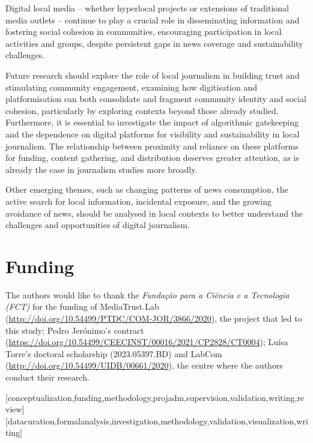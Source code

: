 \documentclass[english]{textolivre}
\begin{document}
Digital local media -- whether hyperlocal projects or extensions of traditional media outlets -- continue to play a crucial role in disseminating information and fostering social cohesion in communities, encouraging participation in local activities and groups, despite persistent gaps in news coverage and sustainability challenges.

Future research should explore the role of local journalism in building trust and stimulating community engagement, examining how digitisation and platformisation can both consolidate and fragment community identity and social cohesion, particularly by exploring contexts beyond those already studied. Furthermore, it is essential to investigate the impact of algorithmic gatekeeping and the dependence on digital platforms for visibility and sustainability in local journalism. The relationship between proximity and reliance on these platforms for funding, content gathering, and distribution deserves greater attention, as is already the case in journalism studies more broadly.

Other emerging themes, such as changing patterns of news consumption, the active search for local information, incidental exposure, and the growing avoidance of news, should be analysed in local contexts to better understand the challenges and opportunities of digital journalism.


\section{Funding}
The authors would like to thank the \emph{Fundação para a Ciência e a Tecnologia (FCT)} for the fun\-ding of MediaTrust.Lab (\url{http://doi.org/10.54499/PTDC/COM-JOR/3866/2020}), the project that led to this study; Pedro Jerónimo’s  contract  (\url{https://doi.org/10.54499/CEECINST/00016/2021/CP2828/CT0004}); Luísa Torre’s doctoral scholarship (2023.05397.BD) and LabCom  (\url{http://doi.org/10.54499/UIDB/00661/2020}), the centre where the authors conduct their research.


\printbibliography\label{sec-bib}

\begin{contributors}
[conceptualization,funding,methodology,projadm,supervision,validation,writing,review]
[datacuration,formalanalysis,investigation,methodology,validation,visualization,writing]
\end{contributors}
\end{document}
